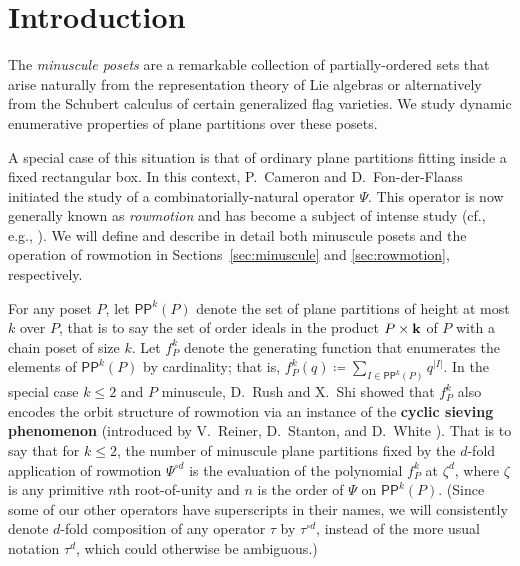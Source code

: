 \documentclass[12pt]{amsart}
\theoremstyle{definition}
\theoremstyle{remark}
\numberwithin{equation}{section}
\newcommand{\pp}{\ensuremath{\mathsf{PP}}}
\begin{document}
\maketitle


%
\section{Introduction}
%
\label{sec:introduction}

The \emph{minuscule posets} are a remarkable collection of partially-ordered sets that arise naturally from the representation theory of Lie algebras or alternatively from the Schubert calculus of certain generalized flag varieties. We study dynamic enumerative properties of plane partitions over these posets.

A special case of this situation is that of ordinary plane partitions fitting inside a fixed rectangular box. In this context, P.~Cameron and D.~Fon-der-Flaass \cite{Cameron.Fonderflaass} initiated the study of a combinatorially-natural operator $\Psi$. This operator is now generally known as \emph{rowmotion} and has become a subject of intense study (cf., e.g., \cite{Panyushev,Striker.Williams,Armstrong.Stump.Thomas,Rush.Shi,Einstein.Propp,Propp.Roby,Grinberg.Roby:2,Grinberg.Roby:1,DPS,Vorland}).
We will define and describe in detail both minuscule posets and the operation of rowmotion in Sections~\ref{sec:minuscule} and \ref{sec:rowmotion}, respectively.

For any poset $P$, let $\pp^k(P)$ denote the set of plane partitions of height at most $k$ over $P$, that is to say the set of order ideals in the product $P \times {\bf k}$ of $P$ with a chain poset of size $k$. Let $f_P^k$ denote the generating function that enumerates the elements of $\pp^k(P)$  by cardinality; that is, 
$
f_P^k(q) \coloneqq \sum_{I \in \pp^k(P)} q^{|I|}.
$ In the special case $k \leq 2$ and $P$ minuscule, D.~Rush and X.~Shi \cite{Rush.Shi} showed that $f_P^k$ also encodes the orbit structure of rowmotion via an instance of the {\bf cyclic sieving phenomenon} (introduced by V.~Reiner, D.~Stanton, and D.~White \cite{Reiner.Stanton.White}). That is to say that for $k \leq 2$, the number of minuscule plane partitions fixed by the $d$-fold application of rowmotion $\Psi^{\circ d}$ is the evaluation of the polynomial $f_P^k$ at $\zeta^d$, where $\zeta$ is any primitive $n$th root-of-unity and $n$ is the order of $\Psi$ on $\pp^k(P)$. (Since some of our other operators have superscripts in their names, we will consistently denote $d$-fold composition of any operator $\tau$ by $\tau^{\circ d}$, instead of the more usual notation $\tau^d$, which could otherwise be ambiguous.)
\end{document}
